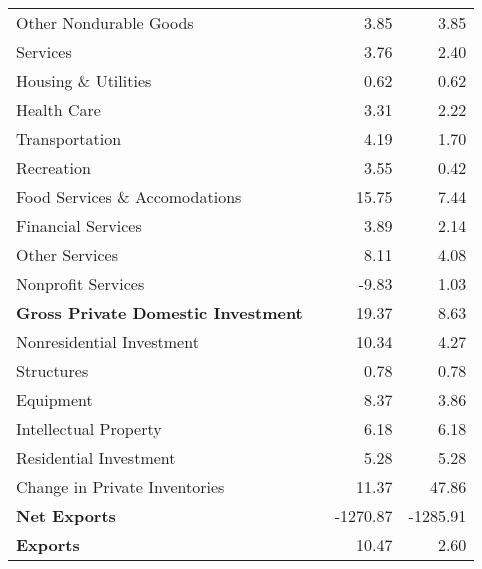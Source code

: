 \documentclass[11pt, letterpaper]{article}\usepackage[]{graphicx}\usepackage[]{color}
\begin{document}
\begin{table}[H]
\begin{tabular}{lrrr}
  \hspace{24mm}  Other Nondurable Goods &  & 3.85 & 3.85 \\ 
  \hspace{8mm}  Services &  & 3.76 & 2.40 \\ 
  \hspace{16mm}  Housing \& Utilities &  & 0.62 & 0.62 \\ 
  \hspace{16mm}  Health Care &  & 3.31 & 2.22 \\ 
  \hspace{16mm}  Transportation &  & 4.19 & 1.70 \\ 
  \hspace{16mm}  Recreation &  & 3.55 & 0.42 \\ 
  \hspace{16mm}  Food Services \& Accomodations &  & 15.75 & 7.44 \\ 
  \hspace{16mm}  Financial Services &  & 3.89 & 2.14 \\ 
  \hspace{16mm}  Other Services &  & 8.11 & 4.08 \\ 
  \hspace{16mm}  Nonprofit Services &  & -9.83 & 1.03 \\ 
  \hspace{0mm} \textbf{Gross Private Domestic Investment} &  & 19.37 & 8.63 \\ 
  \hspace{8mm}  Nonresidential Investment &  & 10.34 & 4.27 \\ 
  \hspace{16mm}  Structures &  & 0.78 & 0.78 \\ 
  \hspace{16mm}  Equipment &  & 8.37 & 3.86 \\ 
  \hspace{16mm}  Intellectual Property &  & 6.18 & 6.18 \\ 
  \hspace{8mm}  Residential Investment &  & 5.28 & 5.28 \\ 
  \hspace{8mm}  Change in Private Inventories &  & 11.37 & 47.86 \\ 
  \hspace{0mm} \textbf{Net Exports} &  & -1270.87 & -1285.91 \\ 
  \hspace{0mm} \textbf{Exports} &  & 10.47 & 2.60 \\ 

\end{tabular}
\end{table}
\end{document}
